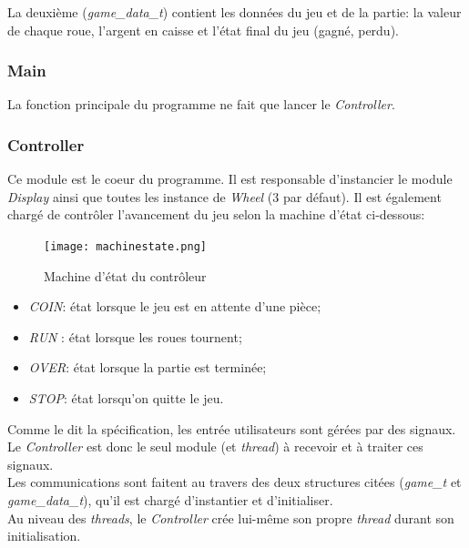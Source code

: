 \documentclass[11pt, a4paper]{article}
\begin{document}
La deuxième (\textit{game\_data\_t}) contient les données du jeu et de la partie:
la valeur de chaque roue, l'argent en caisse et l'état final du jeu (gagné, perdu).

\subsubsection{Main}
La fonction principale du programme ne fait que lancer le \textit{Controller}.

\newpage

\subsubsection{Controller}
Ce module est le coeur du programme.
Il est responsable d'instancier le module \textit{Display} ainsi que toutes les instance de \textit{Wheel} (3 par défaut).
Il est également chargé de contrôler l'avancement du jeu selon la machine d'état ci-dessous:

\begin{figure}[H]
    \begin{center}
        \texttt{[image: machinestate.png]}
    \end{center}
    \caption{Machine d'état du contrôleur}
    \label{Machine d'état du contrôleur}
\end{figure}

\begin{itemize}
    \item \textit{COIN}: état lorsque le jeu est en attente d'une pièce;
    \item \textit{RUN} : état lorsque les roues tournent;
    \item \textit{OVER}: état lorsque la partie est terminée;
    \item \textit{STOP}: état lorsqu'on quitte le jeu. \\
\end{itemize}

Comme le dit la spécification, les entrée utilisateurs sont gérées par des signaux.
Le \textit{Controller} est donc le seul module (et \textit{thread}) à recevoir et à traiter ces signaux. \\

Les communications sont faitent au travers des deux structures citées (\textit{game\_t} et \textit{game\_data\_t}),
qu'il est chargé d'instantier et d'initialiser. \\

Au niveau des \textit{threads}, le \textit{Controller} crée lui-même son propre \textit{thread} durant son initialisation.
\end{document}
